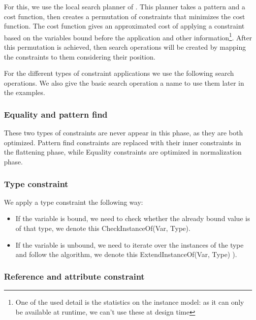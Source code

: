 For this, we use the local search planner of \viatra{}.
This planner takes a pattern and a cost function, then creates a permutation of constraints that minimizes the cost function. 
The cost function gives an approximated cost of applying a constraint based on the variables bound before the application and other information\footnote{One of the used detail is the statistics on the instance model: as it can only be available at runtime, we can't use these at design time}. 
After this permutation is achieved, then search operations will be created by mapping the constraints to them considering their position.

For the different types of constraint applications we use the following search operations. We also give the basic search operation a name to use them later in the examples.


\subsubsection{Equality and pattern find}
These two types of constraints are never appear in this phase, as they are both optimized. Pattern find constraints are replaced with their inner constraints in the flattening phase, while Equality constraints are optimized in normalization phase.


\subsubsection{Type constraint}
We apply a type constraint the following way:

\begin{itemize}
\item If the variable is bound, we need to check whether the already bound value is of that type, we denote this CheckInstanceOf(Var, Type).
\item If the variable is unbound, we need to iterate over the instances of the type and follow the algorithm, we denote this ExtendInstanceOf(Var, Type) ).
\end{itemize}

\newpage
\subsubsection{Reference and attribute constraint}

